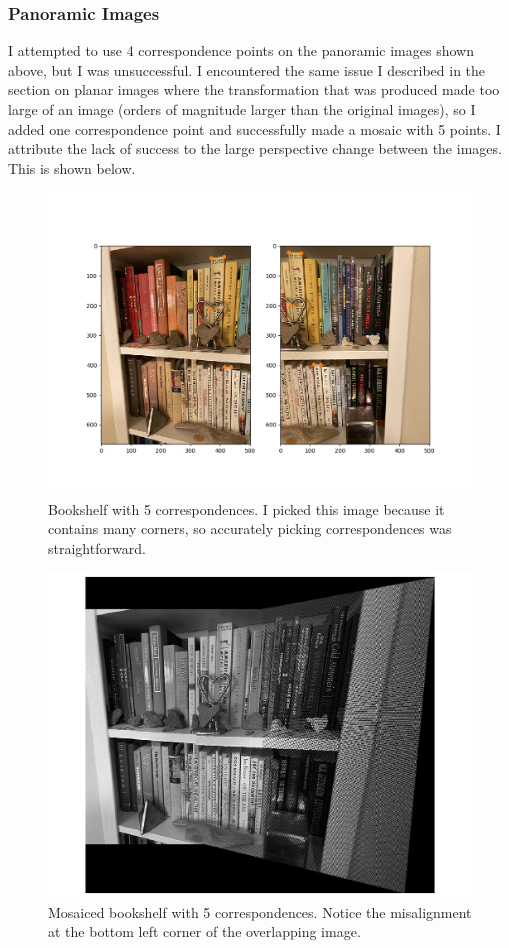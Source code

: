 \documentclass[]{article}
\begin{document}
	\newpage
	
	\subsubsection{Panoramic Images}
	I attempted to use 4 correspondence points on the panoramic images shown above, but I was unsuccessful. I encountered the same issue I described in the section on planar images where the transformation that was produced made too large of an image (orders of magnitude larger than the original images), so I added one correspondence point and successfully made a mosaic with 5 points. I attribute the lack of success to the large perspective change between the images. This is shown below.
	
	\begin{figure}[H]
		\centering
		\includegraphics[width=6.5in]{test_images/shelf_5_correspondences.png}
		\caption{Bookshelf with 5 correspondences. I picked this image because it contains many corners, so accurately picking correspondences was straightforward.}
	\end{figure}
	
	\begin{figure}[H]
		\centering
		\includegraphics[width=6.5in]{test_images/shelf_5_floor.png}
		\caption{Mosaiced bookshelf with 5 correspondences. Notice the misalignment at the bottom left corner of the overlapping image.}	
	\end{figure}
	
\end{document}
